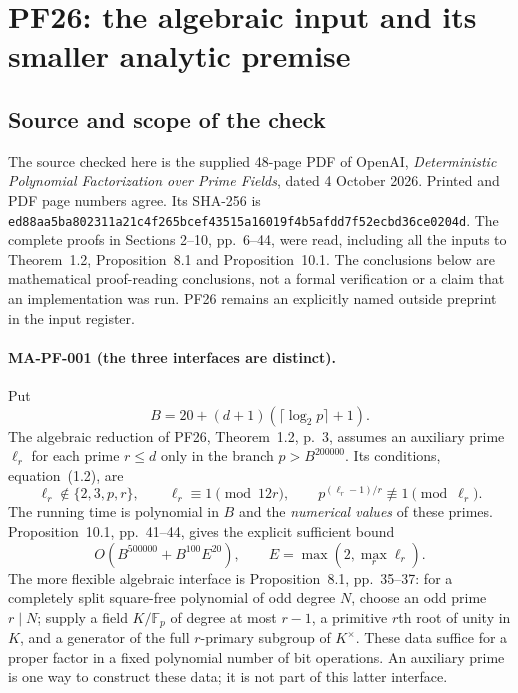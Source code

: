 \section{PF26: the algebraic input and its smaller analytic premise}
\label{sec:pf26-audit}

\subsection{Source and scope of the check}

The source checked here is the supplied 48-page PDF of OpenAI,
\emph{Deterministic Polynomial Factorization over Prime Fields}, dated
4 October 2026.  Printed and PDF page numbers agree. Its SHA-256 is
\texttt{ed88aa5ba802311a21c4f265bcef43515a16019f4b5afdd7f52ecbd36ce0204d}.
The complete proofs in Sections 2--10, pp.~6--44, were read, including all
the inputs to Theorem~1.2, Proposition~8.1 and Proposition~10.1. The
conclusions below are mathematical proof-reading conclusions, not a
formal verification or a claim that an implementation was run. PF26
remains an explicitly named outside preprint in the input register.

\paragraph{MA-PF-001 (the three interfaces are distinct).}
Put
\[
 B=20+(d+1)(\lceil\log_2p\rceil+1).
\]
The algebraic reduction of PF26, Theorem~1.2, p.~3, assumes an auxiliary
prime $\ell_r$ for each prime $r\le d$ only in the branch
$p>B^{200000}$. Its conditions, equation~(1.2), are
\[
 \ell_r\notin\{2,3,p,r\},\qquad
 \ell_r\equiv1\pmod{12r},\qquad
 p^{(\ell_r-1)/r}\not\equiv1\pmod{\ell_r}.
\]
The running time is polynomial in $B$ and the \emph{numerical values}
of these primes. Proposition~10.1, pp.~41--44, gives the explicit
sufficient bound
\[
 O(B^{500000}+B^{100}E^{20}),\qquad E=\max(2,\max_r\ell_r).
 \tag{MA-PF-1}
\]
The more flexible algebraic interface is Proposition~8.1, pp.~35--37:
for a completely split square-free polynomial of odd degree $N$, choose
an odd prime $r\mid N$; supply a field $K/\mathbb F_p$ of degree at
most $r-1$, a primitive $r$th root of unity in $K$, and a generator of
the full $r$-primary subgroup of $K^\times$. These data suffice for a
proper factor in a fixed polynomial number of bit operations. An
auxiliary prime is one way to construct these data; it is not part of
this latter interface.

